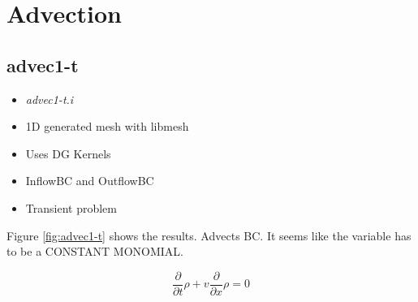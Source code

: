 \documentclass[11pt,letterpaper]{article}
\begin{document}
\section{Advection}

	\subsection{advec1-t}

	\begin{itemize}
		\item \textit{advec1-t.i}
		\item 1D generated mesh with libmesh
		\item Uses DG Kernels
		\item InflowBC and OutflowBC
		\item Transient problem
	\end{itemize}

    Figure \ref{fig:advec1-t} shows the results.
    Advects BC.
    It seems like the variable has to be a CONSTANT MONOMIAL.

	\begin{equation}
    \frac{\partial}{\partial t}\rho + v \frac{\partial}{\partial x} \rho = 0
	\end{equation}
\end{document}
